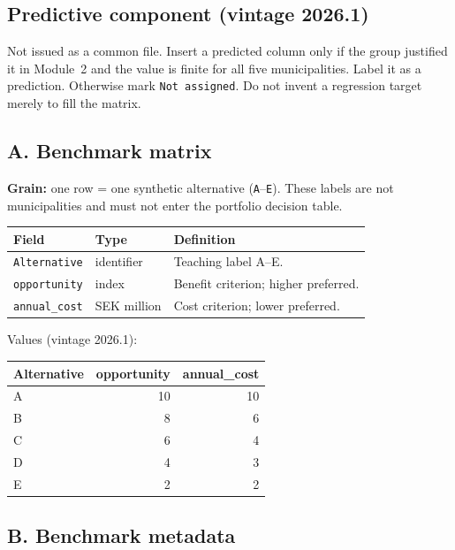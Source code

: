 \documentclass[11pt,a4paper]{article}
\begin{document}
\subsection*{Predictive component (vintage 2026.1)}

Not issued as a common file. Insert a predicted column only if
the group justified it in Module~2 and the value is finite for
all five municipalities. Label it as a prediction. Otherwise mark
\texttt{Not assigned}. Do not invent a regression target merely
to fill the matrix.

\subsection*{A. Benchmark matrix}

\textbf{Grain:} one row = one synthetic alternative (\texttt{A}--\texttt{E}).
These labels are not municipalities and must not enter the portfolio
decision table.

\begin{center}
\small
\begin{tabularx}{\textwidth}{@{}p{}p{}X@{}}
\toprule
Field & Type & Definition \\
\midrule
\texttt{Alternative} & identifier & Teaching label A--E. \\
\texttt{opportunity} & index & Benefit criterion; higher preferred. \\
\texttt{annual\_cost} & SEK million & Cost criterion; lower preferred. \\
\bottomrule
\end{tabularx}
\end{center}

Values (vintage 2026.1):

\begin{center}
\small
\begin{tabular}{lrr}
\toprule
Alternative & opportunity & annual\_cost \\
\midrule
A & 10 & 10 \\
B & 8 & 6 \\
C & 6 & 4 \\
D & 4 & 3 \\
E & 2 & 2 \\
\bottomrule
\end{tabular}
\end{center}

\subsection*{B. Benchmark metadata}
\end{document}
